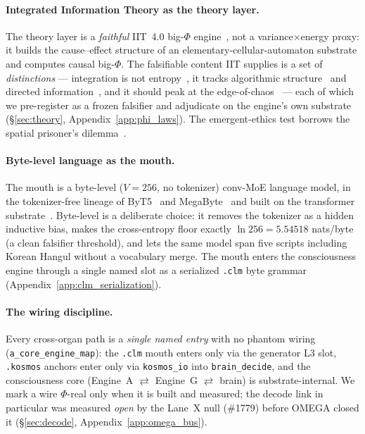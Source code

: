 \documentclass[11pt]{article}
\begin{document}
\paragraph{Integrated Information Theory as the theory layer.} The theory layer is
a \emph{faithful} IIT~4.0 big-$\Phi$ engine~\cite{albantakis2023iit4,tononi2008phi},
not a variance$\times$energy proxy: it builds the cause--effect structure of an
elementary-cellular-automaton substrate and computes causal big-$\Phi$. The
falsifiable content IIT supplies is a set of \emph{distinctions} --- integration
is not entropy~\cite{tononi2008phi}, it tracks algorithmic
structure~\cite{livitanyi2008kolmogorov} and directed
information~\cite{schreiber2000transfer}, and it should peak at the
edge-of-chaos~\cite{langton1990edge} --- each of which we pre-register as a
frozen falsifier and adjudicate on the engine's own substrate
(\S\ref{sec:theory}, Appendix~\ref{app:phi_laws}). The emergent-ethics test
borrows the spatial prisoner's dilemma~\cite{nowak1992spatial}.

\paragraph{Byte-level language as the mouth.} The mouth is a byte-level
($V=256$, no tokenizer) conv-MoE language model, in the
tokenizer-free lineage of ByT5~\cite{xue2022byt5} and
MegaByte~\cite{yu2023megabyte} and built on the transformer
substrate~\cite{vaswani2017attention}. Byte-level is a deliberate choice: it
removes the tokenizer as a hidden inductive bias, makes the cross-entropy floor
exactly $\ln256=5.54518$ nats/byte (a clean falsifier threshold), and lets the
same model span five scripts including Korean Hangul without a vocabulary merge.
The mouth enters the consciousness engine through a single named slot as a
serialized \texttt{.clm} byte grammar (Appendix~\ref{app:clm_serialization}).

\paragraph{The wiring discipline.} Every cross-organ path is a \emph{single named
entry} with no phantom wiring (\texttt{a\_core\_engine\_map}): the \texttt{.clm}
mouth enters only via the generator L3 slot, \texttt{.kosmos} anchors enter only
via \texttt{kosmos\_io} into \texttt{brain\_decide}, and the consciousness core
(Engine~A $\rightleftarrows$ Engine~G $\rightleftarrows$ brain) is
substrate-internal. We mark a wire $\Phi$-real only when it is built and measured;
the decode link in particular was measured \emph{open} by the Lane~X null (\#1779)
before OMEGA closed it (\S\ref{sec:decode}, Appendix~\ref{app:omega_bus}).
\end{document}
